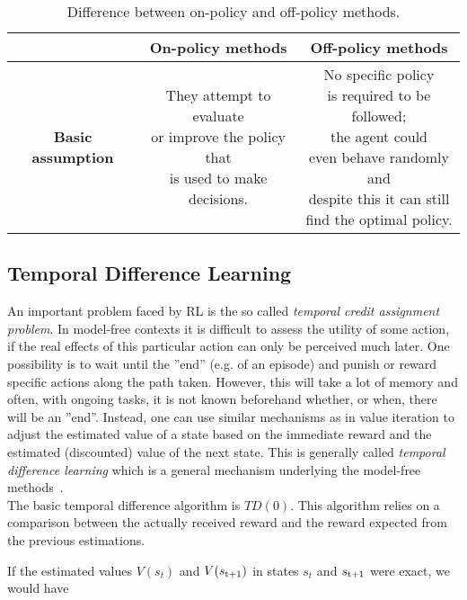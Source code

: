 \begin{table}
\centering
\begin{tabular}{|c|c|c|}
	\hline 
	&\textbf{On-policy methods}  &\textbf{Off-policy methods}  \\ 
	\hline \textbf{Basic assumption}
	& \thead{They attempt to evaluate\\ or improve the policy that\\ is used to make decisions.}  &\thead{No specific policy \\ is required to be followed; \\ the agent could \\ even behave randomly and \\ despite this it can still  \\ find the optimal policy. }  \\ 
	\hline 
\end{tabular}
\caption{Difference between on-policy and off-policy methods.}
\end{table} 

\subsection{Temporal Difference Learning} An important problem faced by RL is the so called \textit{temporal credit assignment problem}. In model-free contexts it is difficult to assess the utility of some action, if the real effects of this particular action can only be perceived much later. One possibility is to wait until the ”end” (e.g. of an episode) and punish or reward specific actions along the path taken. However, this will take a lot of memory and often, with ongoing tasks, it is not known beforehand whether, or when, there will be an ”end”. Instead, one can use similar mechanisms as in value iteration to adjust the estimated value of a state based on the immediate reward and the estimated (discounted) value of the next state. This is generally called \textit{temporal difference learning} which is a general mechanism underlying the model-free methods~\cite{wiering2012reinforcement}. \\ 

The basic temporal difference algorithm is $TD(0)$. This algorithm relies on a comparison between the actually received reward and the reward expected from the previous estimations.

If the estimated values $V(s_t)$ and $V(s\textsubscript{t+1})$ in states $s_t$ and $s\textsubscript{t+1}$ were exact, we would have 


